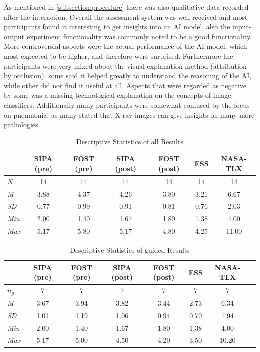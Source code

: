 \documentclass[11pt,a4paper,english]{scrreprt}
\begin{document}
As mentioned in \autoref{subsection:procedure} there was also qualitative data recorded after the interaction. Overall the assessment system was well received and most participants found it interesting to get insights into an AI model, also the input-output experiment functionality was commonly noted to be a good functionality. More controversial aspects were the actual performance of the AI model, which most expected to be higher, and therefore were surprised. Furthermore the participants were very mixed about the visual explanation method (attribution by occlusion); some said it helped greatly to understand the reasoning of the AI, while other did not find it useful at all. Aspects that were regarded as negative by some was a missing technological explanation on the concepts of image classifiers. Additionally many participants were somewhat confused by the focus on pneumonia, as many stated that X-ray images can give insights on many more pathologies.

\begin{table}[htbp]
    \centering
    \begin{tabularx}{\textwidth}{ l c c c c c c }
        \toprule
        & SIPA (pre) & FOST (pre) & SIPA (post) & FOST (post) & ESS & NASA-TLX \\
        \midrule
        \textit{N} & 14 & 14 & 14 & 14 & 14 & 14 \\
        \textit{M} & 3.88 & 4.37 & 4.26 & 3.80 & 3.21 & 6.67 \\
        \textit{SD} & 0.77 & 0.99 & 0.91 & 0.81 & 0.76 & 2.03 \\
        \textit{Min} & 2.00 & 1.40 & 1.67 & 1.80 & 1.38 & 4.00 \\
        \textit{Max} & 5.17 & 5.80 & 5.17 & 4.80 & 4.25 & 11.00 \\
        \bottomrule
    \end{tabularx}
    \caption{Descriptive Statistics of all Results}
    \label{table:evaluation_descriptive}
\end{table}

\begin{table}[htbp]
    \centering
    \begin{tabularx}{\textwidth}{ l c c c c c c c }
        \toprule
        & SIPA (pre) & FOST (pre) & SIPA (post) & FOST (post) & ESS & NASA-TLX \\
        \midrule
        \textit{$n_g$} & 7 & 7 & 7 & 7 & 7 & 7 \\
        \textit{M} & 3.67 & 3.94 & 3.82 & 3.44 & 2.73 & 6.34 \\
        \textit{SD} & 1.01 & 1.19 & 1.06 & 0.94 & 0.70 & 1.94 \\
        \textit{Min} & 2.00 & 1.40 & 1.67 & 1.80 & 1.38 & 4.00 \\
        \textit{Max} & 5.17 & 5.00 & 4.50 & 4.20 & 3.50 & 10.20 \\
        \bottomrule
    \end{tabularx}
    \caption{Descriptive Statistics of guided Results}
    \label{table:evaluation_descriptive_guided}
\end{table}
\end{document}

